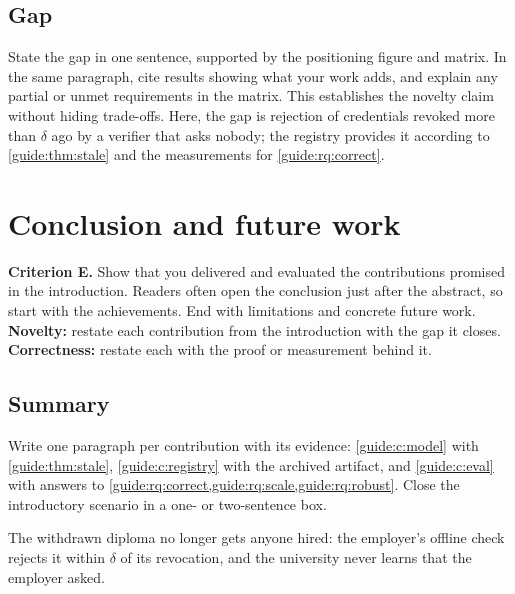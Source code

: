 \subsection{Gap}\label{guide:chapters:gap}
State the gap in one sentence, supported by the positioning figure and matrix. In the same paragraph, cite results showing what your work adds, and explain any partial or unmet requirements in the matrix. This establishes the novelty claim without hiding trade-offs. Here, the gap is rejection of credentials revoked more than $\delta$ ago by a verifier that asks nobody; the registry provides it according to \cref{guide:thm:stale} and the measurements for \cref{guide:rq:correct}.

\section{Conclusion and future work}\label{guide:chapters:conclusion}
\textbf{Criterion E.} Show that you delivered and evaluated the contributions promised in the introduction. Readers often open the conclusion just after the abstract, so start with the achievements. End with limitations and concrete future work.
\textbf{Novelty:} restate each contribution from the introduction with the gap it closes.
\textbf{Correctness:} restate each with the proof or measurement behind it.

\subsection[Summary]{Summary\skimmark}\label{guide:chapters:summary}
Write one paragraph per contribution with its evidence: \cref{guide:c:model} with \cref{guide:thm:stale}, \cref{guide:c:registry} with the archived artifact, and \cref{guide:c:eval} with answers to \cref{guide:rq:correct,guide:rq:scale,guide:rq:robust}. Close the introductory scenario in a one- or two-sentence box.
\begin{runningexample}[in retrospect]
The withdrawn diploma no longer gets anyone hired: the employer's offline check rejects it within $\delta$ of its revocation, and the university never learns that the employer asked.
\end{runningexample}

